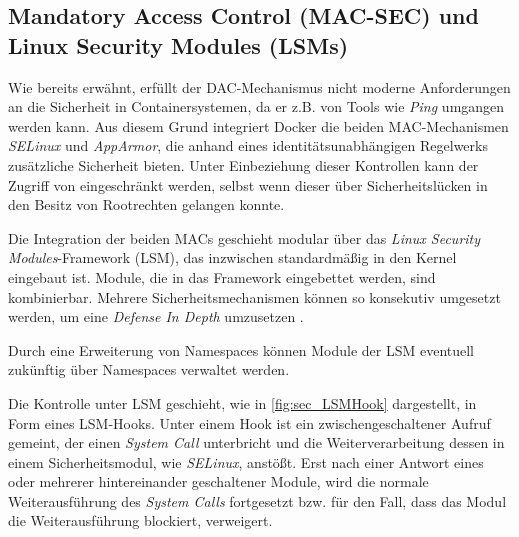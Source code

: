 \documentclass[../main.tex]{subfiles}
\begin{document}



    \subsection{Mandatory Access Control (\acrshort{MAC-SEC}) und Linux Security Modules (\acrshort{LSM}s)}
		\label{lsm}
			Wie bereits erwähnt, erfüllt der DAC-Mechanismus nicht moderne Anforderungen an die Sicherheit in Containersystemen, da er z.B. von Tools wie \emph{Ping} umgangen werden kann. Aus diesem Grund integriert Docker die beiden MAC-Mechanismen \emph{\acrshort{SELinux}} und \emph{\acrshort{AppArmor}}, die anhand eines identitätsunabhängigen Regelwerks zusätzliche Sicherheit bieten. Unter Einbeziehung dieser Kontrollen kann der Zugriff von \cbroken{} eingeschränkt werden, selbst wenn dieser über Sicherheitslücken in den Besitz von Rootrechten gelangen konnte.

			Die Integration der beiden MACs geschieht modular über das \emph{Linux Security Modules}-Framework (\acrshort{LSM}), das inzwischen standardmäßig in den Kernel eingebaut ist. Module, die in das Framework eingebettet werden, sind kombinierbar. Mehrere Sicherheitsmechanismen können so konsekutiv umgesetzt werden, um eine \emph{Defense In Depth} umzusetzen \cite[S.3]{LSMFramework}.

			Durch eine Erweiterung von Namespaces können Module der LSM eventuell zukünftig über Namespaces verwaltet werden.

			Die Kontrolle unter LSM geschieht, wie in \fig \ref{fig:sec_LSMHook} dargestellt, in Form eines LSM-Hooks. Unter einem Hook ist ein zwischengeschaltener Aufruf gemeint, der einen \emph{System Call} unterbricht und die Weiterverarbeitung dessen in einem Sicherheitsmodul, wie \emph{SELinux}, anstößt. Erst nach einer Antwort eines oder mehrerer hintereinander geschaltener Module, wird die normale Weiterausführung des \emph{System Calls} fortgesetzt bzw. für den Fall, dass das Modul die Weiterausführung blockiert, verweigert.
\end{document}
